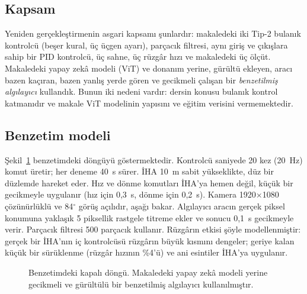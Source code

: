 \documentclass[conference,a4paper]{IEEEtran}
\begin{document}
\subsection{Kapsam}
Yeniden gerçekleştirmenin asgari kapsamı şunlardır: makaledeki iki Tip-2 bulanık kontrolcü (beşer kural, üç üçgen ayarı), parçacık filtresi, aynı giriş ve çıkışlara sahip bir PID kontrolcü, üç sahne, üç rüzgâr hızı ve makaledeki üç ölçüt. Makaledeki yapay zekâ modeli (ViT) ve donanım yerine, gürültü ekleyen, aracı bazen kaçıran, bazen yanlış yerde gören ve gecikmeli çalışan bir \emph{benzetilmiş algılayıcı} kullandık. Bunun iki nedeni vardır: dersin konusu bulanık kontrol katmanıdır ve makale ViT modelinin yapısını ve eğitim verisini vermemektedir.

\subsection{Benzetim modeli}
Şekil~\ref{fig:arch} benzetimdeki döngüyü göstermektedir. Kontrolcü saniyede 20 kez (20~Hz) komut üretir; her deneme 40~s sürer. İHA 10~m sabit yükseklikte, düz bir düzlemde hareket eder. Hız ve dönme komutları İHA'ya hemen değil, küçük bir gecikmeyle uygulanır (hız için 0,3~s, dönme için 0,2~s). Kamera 1920$\times$1080 çözünürlüklü ve 84$^\circ$ görüş açılıdır, aşağı bakar. Algılayıcı aracın gerçek piksel konumuna yaklaşık 5 piksellik rastgele titreme ekler ve sonucu 0,1~s gecikmeyle verir. Parçacık filtresi 500 parçacık kullanır. Rüzgârın etkisi şöyle modellenmiştir: gerçek bir İHA'nın iç kontrolcüsü rüzgârın büyük kısmını dengeler; geriye kalan küçük bir sürüklenme (rüzgâr hızının \%4'ü) ve ani esintiler İHA'ya uygulanır.

\begin{figure}[t]
\centering
{}
\caption{Benzetimdeki kapalı döngü. Makaledeki yapay zekâ modeli yerine gecikmeli ve gürültülü bir benzetilmiş algılayıcı kullanılmıştır.}
\label{fig:arch}
\end{figure}
\end{document}
